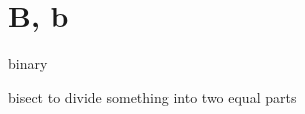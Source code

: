 \section{B, b}

\begin{word}{binary}
\end{word}

\begin{word}{bisect}
    to divide something into two equal parts
\end{word}